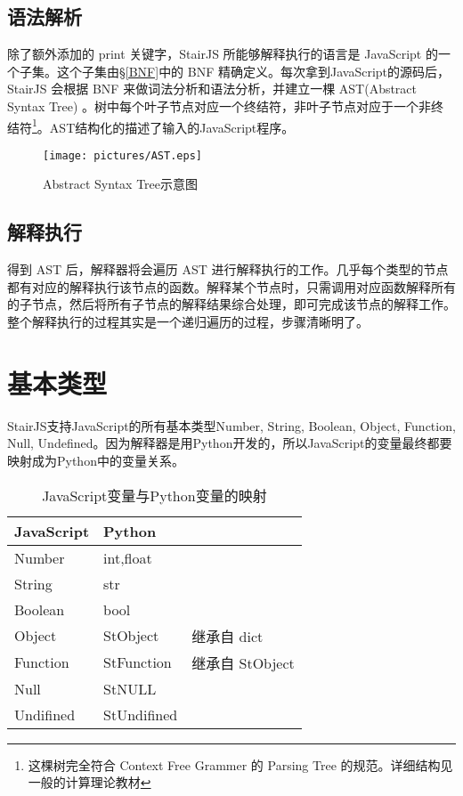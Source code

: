 \documentclass[a4paper]{article}
\begin{document}
\begin{CJK}{UTF8}{gbsn}
    \subsection{语法解析}
        除了额外添加的 print 关键字，StairJS 所能够解释执行的语言是 JavaScript 的一个子集。这个子集由\S\ref{BNF}中的 BNF 精确定义。每次拿到JavaScript的源码后， StairJS 会根据 BNF 来做词法分析和语法分析，并建立一棵 AST(Abstract Syntax Tree) 。树中每个叶子节点对应一个终结符，非叶子节点对应于一个非终结符\footnote{这棵树完全符合 Context Free Grammer 的 Parsing Tree 的规范。详细结构见一般的计算理论教材}。AST结构化的描述了输入的JavaScript程序。\\
        \begin{figure}[h]
        \center
        \texttt{[image: pictures/AST.eps]}
        \caption{Abstract Syntax Tree示意图}
        \end{figure}

    \subsection{解释执行}
        得到 AST 后，解释器将会遍历 AST 进行解释执行的工作。几乎每个类型的节点都有对应的解释执行该节点的函数。解释某个节点时，只需调用对应函数解释所有的子节点，然后将所有子节点的解释结果综合处理，即可完成该节点的解释工作。整个解释执行的过程其实是一个递归遍历的过程，步骤清晰明了。
\section{基本类型}
    StairJS支持JavaScript的所有基本类型Number, String, Boolean, Object, Function, Null, Undefined。因为解释器是用Python开发的，所以JavaScript的变量最终都要映射成为Python中的变量关系。
    \begin{table}[h]
        \center
        \begin{tabular}{lll}
            JavaScript & Python \\
            \hline
            Number      & int,float \\
            String      & str \\
            Boolean     & bool \\
            Object      & StObject    & 继承自 dict \\
            Function    & StFunction  & 继承自 StObject \\
            Null        & StNULL \\
            Undifined   & StUndifined \\
        \end{tabular}
        \caption{JavaScript变量与Python变量的映射}
    \end{table}


\end{CJK}
\end{document}
